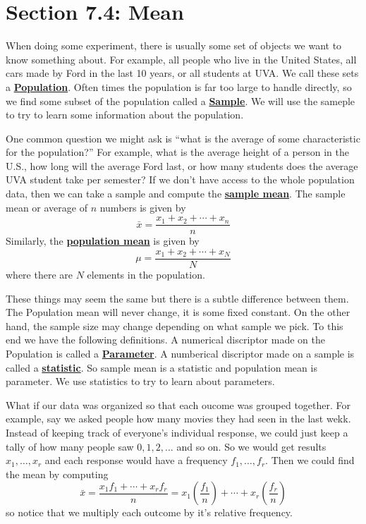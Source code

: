 \documentclass[14,fleqn]{article}
\newcommand{\defn}[1]{\textbf{\underline{#1}}}
\begin{document}
\section{Section 7.4: Mean}

When doing some experiment, there is usually some set of objects we want to know something about. For example, all people who live in the United States, all cars made by Ford in the last 10 years, or all students at UVA. We call these sets a \defn{Population}. Often times the population is far too large to handle directly, so we find some subset of the population called a \defn{Sample}. We will use the sameple to try to learn some information about the population.

One common question we might ask is ``what is the average of some characteristic for the population?'' For example, what is the average height of a person in the U.S., how long will the average Ford last, or how many students does the average UVA student take per semester? If we don't have access to the whole population data, then we can take a sample and compute the \defn{sample mean}. The sample mean or average of $n$ numbers is given by 
\[
	\bar{x}=\frac{x_1+x_2+\cdots +x_n}{n}
\]
Similarly, the \defn{population mean} is given by
\[
	\mu=\frac{x_1+x_2+\cdots +x_N}{N}
\]
where there are $N$ elements in the population.

These things may seem the same but there is a subtle difference between them. The Population mean will never change, it is some fixed constant. On the other hand, the sample size may change depending on what sample we pick. To this end we have the following definitions. A numerical discriptor made on the Population is called a \defn{Parameter}. A numberical discriptor made on a sample is called a \defn{statistic}. So sample mean is a statistic and population mean is parameter. We use statistics to try to learn about parameters. 

What if our data was organized so that each oucome was grouped together. For example, say we asked people how many movies they had seen in the last wekk. Instead of keeping track of everyone's individual response, we could just keep a tally of how many people saw $0,1,2,\dots$ and so on. So we would get results $x_1,\dots,x_r$ and each response would have a frequency $f_1,\dots,f_r.$ Then we could find the mean by computing
\[
	\bar{x}=\frac{x_1f_1+\cdots +x_rf_r}{n}=x_1\left(\frac{f_1}{n}\right)+\cdots +x_r\left(\frac{f_r}{n}\right)
\]
so notice that we multiply each outcome by it's relative frequency.
\end{document}
